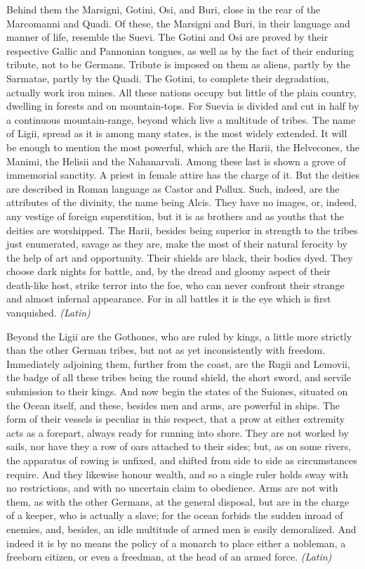 Behind them the Marsigni, Gotini, Osi, and Buri, close in the rear of the Marcomanni and Quadi. Of these, the Marsigni and Buri, in their language and manner of life, resemble the Suevi. The Gotini and Osi are proved by their respective Gallic and Pannonian tongues, as well as by the fact of their enduring tribute, not to be Germans. Tribute is imposed on them as aliens, partly by the Sarmatae, partly by the Quadi. The Gotini, to complete their degradation, actually work iron mines. All these nations occupy but little of the plain country, dwelling in forests and on mountain-tops. For Suevia is divided and cut in half by a continuous mountain-range, beyond which live a multitude of tribes. The name of Ligii, spread as it is among many states, is the most widely extended. It will be enough to mention the most powerful, which are the Harii, the Helvecones, the Manimi, the Helisii and the Nahanarvali. Among these last is shown a grove of immemorial sanctity. A priest in female attire has the charge of it. But the deities are described in Roman language as Castor and Pollux. Such, indeed, are the attributes of the divinity, the name being Alcis. They have no images, or, indeed, any vestige of foreign superstition, but it is as brothers and as youths that the deities are worshipped. The Harii, besides being superior in strength to the tribes just enumerated, savage as they are, make the most of their natural ferocity by the help of art and opportunity. Their shields are black, their bodies dyed. They choose dark nights for battle, and, by the dread and gloomy aspect of their death-like host, strike terror into the foe, who can never confront their strange and almost infernal appearance. For in all battles it is the eye which is first vanquished. \emph{(Latin)}


Beyond the Ligii are the Gothones, who are ruled by kings, a little more strictly than the other German tribes, but not as yet inconsistently with freedom. Immediately adjoining them, further from the coast, are the Rugii and Lemovii, the badge of all these tribes being the round shield, the short sword, and servile submission to their kings. And now begin the states of the Suiones, situated on the Ocean itself, and these, besides men and arms, are powerful in ships. The form of their vessels is peculiar in this respect, that a prow at either extremity acts as a forepart, always ready for running into shore. They are not worked by sails, nor have they a row of oars attached to their sides; but, as on some rivers, the apparatus of rowing is unfixed, and shifted from side to side as circumstances require. And they likewise honour wealth, and so a single ruler holds sway with no restrictions, and with no uncertain claim to obedience. Arms are not with them, as with the other Germans, at the general disposal, but are in the charge of a keeper, who is actually a slave; for the ocean forbids the sudden inroad of enemies, and, besides, an idle multitude of armed men is easily demoralized. And indeed it is by no means the policy of a monarch to place either a nobleman, a freeborn citizen, or even a freedman, at the head of an armed force. \emph{(Latin)}

